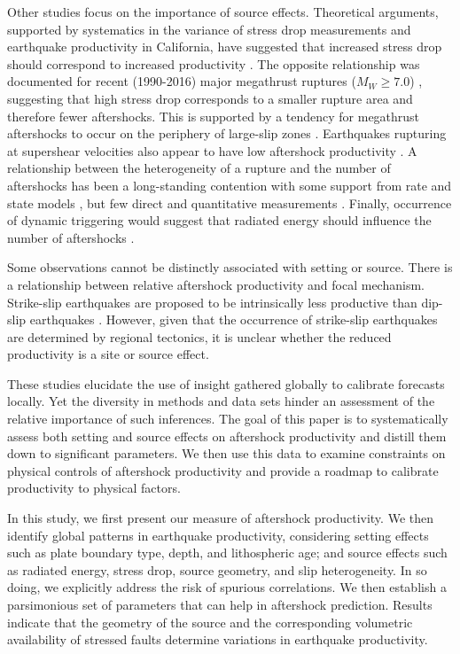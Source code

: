 \documentclass[draft, jgrga]{agujournal2018}
\begin{document}
Other studies focus on the importance of source effects. Theoretical arguments, supported by systematics in the variance of stress drop measurements and earthquake productivity in California, have suggested that increased stress drop should correspond to increased productivity \citep{Marsan2017HowAftershocks}. The opposite relationship was documented for recent (1990-2016) major megathrust ruptures ($M_W \ge 7.0$) \citep{Wetzler2016}, suggesting that high stress drop corresponds to a smaller rupture area and therefore fewer aftershocks. This is supported by a tendency for megathrust aftershocks to occur on the periphery of large-slip zones \citep{Wetzler2016, VanDerElst2015LargerAftershocks}. Earthquakes rupturing at supershear velocities also appear to have low aftershock productivity \citep{Bouchon2008TheEarthquakes}. A relationship between the heterogeneity of a rupture and the number of aftershocks has been a long-standing contention \citep{Mogi1967, Yamanaka1990scalingshock} with some support from rate and state models \citep{Helmstetter2006RelationModel, Marsan2006}, but few direct and quantitative measurements \citep{Das2003SpatialDistribution, Houston2004}. Finally, occurrence of dynamic triggering would suggest that radiated energy should influence the number of aftershocks \citep{felzer2006decay}.  

Some observations cannot be distinctly associated with setting or source. There is a relationship between relative aftershock productivity and focal mechanism. Strike-slip earthquakes are proposed to be intrinsically less productive than dip-slip earthquakes \citep{Tahir2012, Tahir2014Aftershock2005, Tahir2015}. However, given that the occurrence of strike-slip earthquakes are determined by regional tectonics, it is unclear whether the reduced productivity is a site or source effect.

These studies elucidate the use of insight gathered globally to calibrate forecasts locally. Yet the diversity in methods and data sets hinder an assessment of the relative importance of such inferences. The goal of this paper is to systematically assess both setting and source effects on aftershock productivity and distill them down to significant parameters. We then use this data to examine constraints on physical controls of aftershock productivity and provide a roadmap to calibrate productivity to physical factors. 

In this study, we first present our measure of aftershock productivity. We then identify global patterns in earthquake productivity, considering setting effects such as plate boundary type, depth, and lithospheric age; and source effects such as radiated energy, stress drop, source geometry, and slip heterogeneity. In so doing, we explicitly address the risk of spurious correlations. We then establish a parsimonious set of parameters that can help in aftershock prediction. Results indicate that the geometry of the source and the corresponding volumetric availability of stressed faults determine variations in earthquake productivity.
\end{document}
